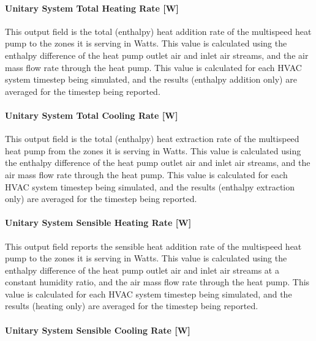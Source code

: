 \paragraph{Unitary System Total Heating Rate {[}W{]}}\label{unitary-system-total-heating-rate-w-1}

This output field is the total (enthalpy) heat addition rate of the multispeed heat pump to the zones it is serving in Watts. This value is calculated using the enthalpy difference of the heat pump outlet air and inlet air streams, and the air mass flow rate through the heat pump. This value is calculated for each HVAC system timestep being simulated, and the results (enthalpy addition only) are averaged for the timestep being reported.

\paragraph{Unitary System Total Cooling Rate {[}W{]}}\label{unitary-system-total-cooling-rate-w-1}

This output field is the total (enthalpy) heat extraction rate of the multispeed heat pump from the zones it is serving in Watts. This value is calculated using the enthalpy difference of the heat pump outlet air and inlet air streams, and the air mass flow rate through the heat pump. This value is calculated for each HVAC system timestep being simulated, and the results (enthalpy extraction only) are averaged for the timestep being reported.

\paragraph{Unitary System Sensible Heating Rate {[}W{]}}\label{unitary-system-sensible-heating-rate-w-1}

This output field reports the sensible heat addition rate of the multispeed heat pump to the zones it is serving in Watts. This value is calculated using the enthalpy difference of the heat pump outlet air and inlet air streams at a constant humidity ratio, and the air mass flow rate through the heat pump. This value is calculated for each HVAC system timestep being simulated, and the results (heating only) are averaged for the timestep being reported.

\paragraph{Unitary System Sensible Cooling Rate {[}W{]}}\label{unitary-system-sensible-cooling-rate-w-1}

